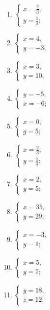 \begin{enumerate}[start=1]
\item
  \(\left\{ \begin{array}{l} x = \frac{2}{3}, \\ y = \frac{1}{3}; \end{array} \right.\)
\item
  \(\left\{ \begin{array}{l} x = 4, \\ y = -3; \end{array} \right.\)
\item
  \(\left\{ \begin{array}{l} x = 3, \\ y = 10; \end{array} \right.\)
\item
  \(\left\{ \begin{array}{l} y = -5, \\ x = -6; \end{array} \right.\)
\item
  \(\left\{ \begin{array}{l} x = 0, \\ g = 5; \end{array} \right.\)
\item
  \(\left\{ \begin{array}{l} x = \frac{2}{3}, \\ y = \frac{1}{3}; \end{array} \right.\)
\item
  \(\left\{ \begin{array}{l} x = 2, \\ y = 5; \end{array} \right.\)
\item
  \(\left\{ \begin{array}{l} x = 35, \\ y = 29; \end{array} \right.\)
\item
  \(\left\{ \begin{array}{l} x = -3, \\ y = 1; \end{array} \right.\)
\item
  \(\left\{ \begin{array}{l} x = 5, \\ y = 7; \end{array} \right.\)
\item
  \(\left\{ \begin{array}{l} y = 18, \\ z = 12; \end{array} \right.\)

\end{enumerate}
